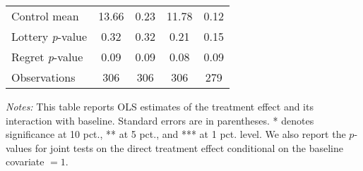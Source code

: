 \begin{table}[htbp]
{\begin{threeparttable}
\begin{tabular}{l*{4}{c}}
Control mean    &    13.66         &     0.23         &    11.78         &     0.12         \\
Lottery \emph{p}-value&     0.32         &     0.32         &     0.21         &     0.15         \\
Regret \emph{p}-value&     0.09         &     0.09         &     0.08         &     0.09         \\
Observations    &      306         &      306         &      306         &      279         \\
\bottomrule \end{tabular} \begin{tablenotes}[flushleft] \footnotesize \item \emph{Notes:} This table reports OLS estimates of the treatment effect and its interaction with baseline. Standard errors are in parentheses. * denotes significance at 10 pct., ** at 5 pct., and *** at 1 pct. level. We also report the \(p\)-values for joint tests on the direct treatment effect conditional on the baseline covariate $= 1$. \end{tablenotes} \end{threeparttable} } \end{table}
